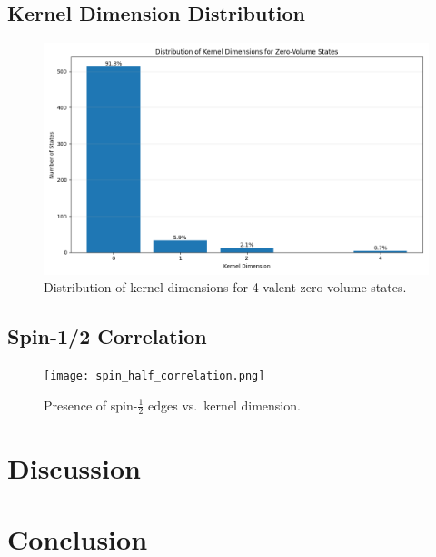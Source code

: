 \documentclass[11pt]{article}
\begin{document}
\subsection{Kernel Dimension Distribution}
\begin{figure}[ht]
  \centering
  \includegraphics[width=0.8\linewidth]{kernel_dimension_distribution.png}
  \caption{Distribution of kernel dimensions for 4-valent zero-volume states.}
  \label{fig:kernel_dim_dist}
\end{figure}

\subsection{Spin-1/2 Correlation}
\begin{figure}[ht]
  \centering
  \texttt{[image: spin\_half\_correlation.png]}
  \caption{Presence of spin-$\tfrac{1}{2}$ edges vs.\ kernel dimension.}
  \label{fig:spin_half_corr}
\end{figure}

\section{Discussion}

\section{Conclusion}



\end{document}
